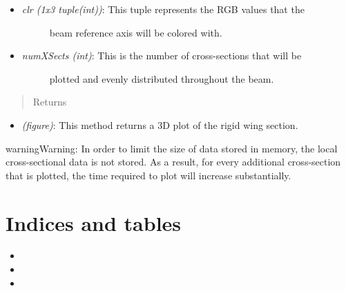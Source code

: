\documentclass[letterpaper,10pt,english]{sphinxmanual}
\begin{document}
\begin{fulllineitems}
\begin{fulllineitems}
\begin{itemize}
\begin{description}
\end{description}

\item {} \begin{description}
\item[{\emph{clr (1x3 tuple(int))}: This tuple represents the RGB values that the}] \leavevmode
beam reference axis will be colored with.

\end{description}

\item {} \begin{description}
\item[{\emph{numXSects (int)}: This is the number of cross-sections that will be}] \leavevmode
plotted and evenly distributed throughout the beam.

\end{description}

\end{itemize}
\begin{quote}\begin{description}
\item[{Returns}] \leavevmode
\end{description}\end{quote}
\begin{itemize}
\item {} 
\emph{(figure)}: This method returns a 3D plot of the rigid wing section.

\end{itemize}

\begin{notice}{warning}{Warning:}
In order to limit the size of data stored in memory, the
local cross-sectional data is not stored. As a result, for every
additional cross-section that is plotted, the time required to plot
will increase substantially.
\end{notice}

\end{fulllineitems}


\end{fulllineitems}



\chapter{Indices and tables}
\label{index:indices-and-tables}\begin{itemize}
\item {} 

\item {} 

\item {} 

\end{itemize}
\end{document}
